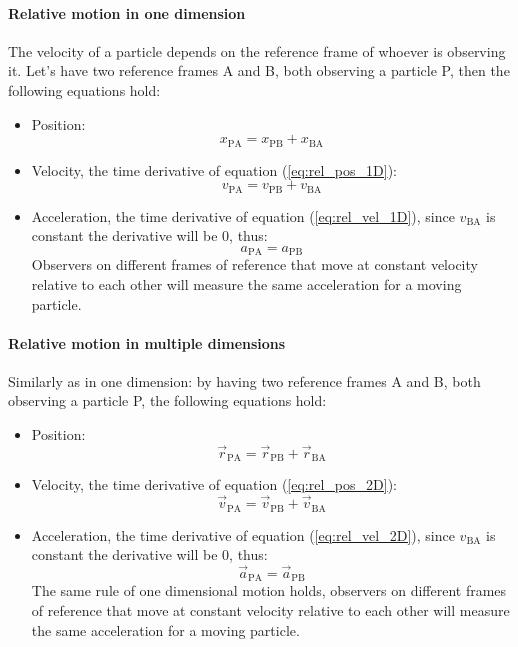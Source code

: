 \paragraph{Relative motion in one dimension} The velocity of a particle depends on the reference frame of whoever is observing it. Let's have two reference frames A and B, both observing a particle P, then the following equations hold:
\begin{itemize}
\item Position:
\begin{equation} \label{eq:rel_pos_1D}
    x_{\mathrm{PA}} = x_{\mathrm{PB}} + x_{\mathrm{BA}}
\end{equation}
\item Velocity, the time derivative of equation (\ref{eq:rel_pos_1D}):
\begin{equation} \label{eq:rel_vel_1D}
    v_{\mathrm{PA}} = v_{\mathrm{PB}} + v_{\mathrm{BA}}
\end{equation}
\item Acceleration, the time derivative of equation (\ref{eq:rel_vel_1D}), since $v_{\mathrm{BA}}$ is constant the derivative will be $0$, thus:
\begin{equation}
    a_{\mathrm{PA}} = a_{\mathrm{PB}}
\end{equation}
Observers on different frames of reference that move at constant velocity relative to each other will measure the same acceleration for a moving particle.
\end{itemize}
\paragraph{Relative motion in multiple dimensions} Similarly as in one dimension: by having two reference frames A and B, both observing a particle P, the following equations hold:
\begin{itemize}
\item Position:
\begin{equation} \label{eq:rel_pos_2D}
    \vec{r}_{\mathrm{PA}} = \vec{r}_{\mathrm{PB}} + \vec{r}_{\mathrm{BA}}
\end{equation}
\item Velocity, the time derivative of equation (\ref{eq:rel_pos_2D}):
\begin{equation} \label{eq:rel_vel_2D}
    \vec{v}_{\mathrm{PA}} = \vec{v}_{\mathrm{PB}} + \vec{v}_{\mathrm{BA}}
\end{equation}
\item Acceleration, the time derivative of equation (\ref{eq:rel_vel_2D}), since $v_{\mathrm{BA}}$ is constant the derivative will be $0$, thus:
\begin{equation}
    \vec{a}_{\mathrm{PA}} = \vec{a}_{\mathrm{PB}}
\end{equation}
The same rule of one dimensional motion holds, observers on different frames of reference that move at constant velocity relative to each other will measure the same acceleration for a moving particle. 
\end{itemize}